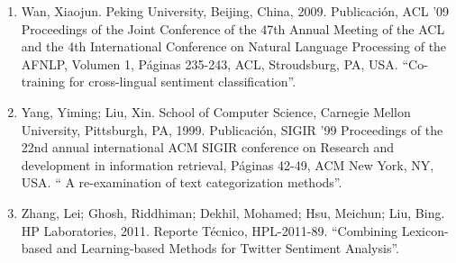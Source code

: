 \begin{enumerate}
\item Wan, Xiaojun. Peking University, Beijing, China, 2009. Publicaci\'on, ACL '09 Proceedings of the Joint Conference of the 47th Annual Meeting of the ACL and the 4th International Conference on Natural Language Processing of the AFNLP, Volumen 1, P\'aginas 235-243, ACL, Stroudsburg, PA, USA. ``Co-training for cross-lingual sentiment classification''.
\item Yang, Yiming; Liu, Xin. School of Computer Science, Carnegie Mellon University, Pittsburgh, PA, 1999. Publicaci\'on, SIGIR '99 Proceedings of the 22nd annual international ACM SIGIR conference on Research and development in information retrieval, P\'aginas 42-49, ACM New York, NY, USA. ``
A re-examination of text categorization methods''.
\item Zhang, Lei; Ghosh, Riddhiman; Dekhil, Mohamed; Hsu, Meichun; Liu, Bing. HP Laboratories, 2011. Reporte T\'ecnico, HPL-2011-89. ``Combining Lexicon-based and Learning-based Methods for Twitter Sentiment Analysis''.

\end{enumerate}
